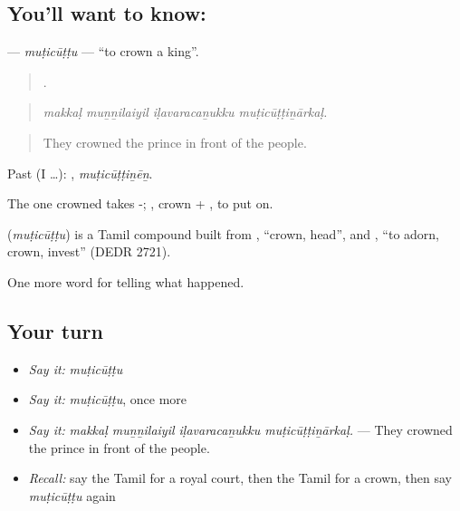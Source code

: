 \subsection*{You'll want to know: }
\textbf{} — \emph{muṭicūṭṭu} — \textquotedblleft{}to crown a king\textquotedblright{}.

\begin{quote}
   .
\end{quote}

\begin{quote}
\emph{makkaḷ muṉṉilaiyil iḷavaracaṉukku muṭicūṭṭiṉārkaḷ.}
\end{quote}

\begin{quote}
They crowned the prince in front of the people.
\end{quote}

Past (I …): , \emph{muṭicūṭṭiṉēṉ}.

The one crowned takes -; , crown + , to put on.

\begin{cousinweb}
\textbf{} (\emph{muṭicūṭṭu}) is a Tamil compound built from , \textquotedblleft{}crown, head\textquotedblright{}, and , \textquotedblleft{}to adorn, crown, invest\textquotedblright{} (DEDR 2721).
\end{cousinweb}

\begin{grammarlens}[title={What you've built}]
One more word for telling what happened.
\end{grammarlens}

\subsection*{Your turn}
\begin{itemize}
\raggedright
  \item \emph{Say it:} \emph{muṭicūṭṭu}
  \item \emph{Say it:} \emph{muṭicūṭṭu}, once more
  \item \emph{Say it:} \emph{makkaḷ muṉṉilaiyil iḷavaracaṉukku muṭicūṭṭiṉārkaḷ.} — They crowned the prince in front of the people.
  \item \emph{Recall:} say the Tamil for a royal court, then the Tamil for a crown, then say \emph{muṭicūṭṭu} again
\end{itemize}

